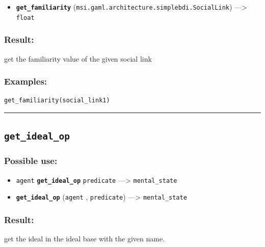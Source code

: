 \documentclass[]{book}
\providecommand{\tightlist}{%
  \setlength{\itemsep}{0pt}\setlength{\parskip}{0pt}}
\theoremstyle{definition}
\theoremstyle{definition}
\theoremstyle{definition}
\theoremstyle{remark}
\begin{document}
\begin{itemize}
\tightlist
\item
  \textbf{\texttt{get\_familiarity}}
  (\texttt{msi.gaml.architecture.simplebdi.SocialLink})
  ---\textgreater{} \texttt{float}
\end{itemize}

\subsubsection{Result:}\label{result-202}

get the familiarity value of the given social link

\subsubsection{Examples:}\label{examples-155}

\begin{verbatim}
get_familiarity(social_link1) 
\end{verbatim}

\begin{center}\rule{0.5\linewidth}{\linethickness}\end{center}

\subsection{\texorpdfstring{\texttt{get\_ideal\_op}}{get\_ideal\_op}}\label{get_ideal_op}

\subsubsection{Possible use:}\label{possible-use-209}

\begin{itemize}
\tightlist
\item
  \texttt{agent} \textbf{\texttt{get\_ideal\_op}} \texttt{predicate}
  ---\textgreater{} \texttt{mental\_state}
\item
  \textbf{\texttt{get\_ideal\_op}} (\texttt{agent} , \texttt{predicate})
  ---\textgreater{} \texttt{mental\_state}
\end{itemize}

\subsubsection{Result:}\label{result-203}

get the ideal in the ideal base with the given name.
\end{document}

